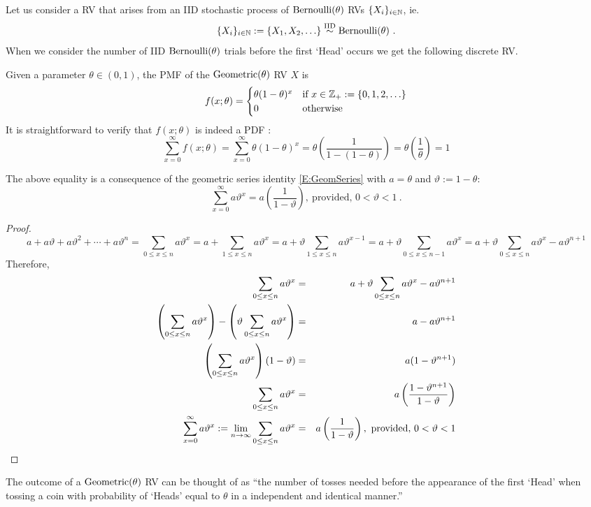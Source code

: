 Let us consider a RV that arises from an IID stochastic process of $\mbox{{\rm Bernoulli}}(\theta)$ RVs $\{X_i\}_{i \in \mathbb{N}}$, ie.~
\[
 \{X_i\}_{i \in \mathbb{N}} := \{X_1, X_2,\ldots\}  \overset{{\rm IID}}{\sim} \mbox{{\rm Bernoulli}}(\theta) \ .
\]
When we consider the number of IID $\mbox{{\rm Bernoulli}}(\theta)$ trials before the first `Head' occurs we get the following discrete RV.
\begin{model}
Given a parameter $\theta \in (0,1)$, the PMF of the $\mbox{{\rm Geometric}}(\theta)$ RV $X$ is
\begin{equation}\label{E:Geometricpdf}
f(x;\theta) =
\begin{cases}
\theta(1-\theta)^{x} & \text{if $x \in \mathbb{Z}_+ := \{0,1,2,\ldots \}$} \\
0 & \text{otherwise}
\end{cases}
\end{equation}
It is straightforward to verify that $f(x;\theta)$ is indeed a PDF :
\[
\sum_{x=0}^{\infty} f(x;\theta) = \sum_{x=0}^{\infty} \theta(1-\theta)^{x}
= \theta \left( \frac{1}{1-(1-\theta)} \right) =  \theta \left( \frac{1}{\theta} \right) = 1
\]

{\scriptsize
The above equality is a consequence of the geometric series identity \eqref{E:GeomSeries} with $a=\theta$ and $\vartheta:=1-\theta$:
\begin{equation}\label{E:GeomSeries}
 \sum_{ x =0}^{\infty} a \vartheta^x = a \left( \frac{1}{1-\vartheta} \right) , \ \text{provided, } 0 < \vartheta < 1 \ .
\end{equation}
\begin{proof}
\[
a+a\vartheta+a\vartheta^2+\cdots+a\vartheta^n
= \sum_{0 \leq x \leq n} a \vartheta^x
= a+ \sum_{1 \leq x \leq n} a \vartheta^x
= a +  \vartheta  \sum_{1 \leq x \leq n} a \vartheta^{x-1}
= a +  \vartheta  \sum_{0 \leq x \leq n-1} a \vartheta^{x}
= a +  \vartheta  \sum_{0 \leq x \leq n} a \vartheta^{x} - a \vartheta^{n+1}
\]
Therefore,
\begin{eqnarray}
\sum_{0 \leq x \leq n} a \vartheta^x
&=&  a +  \vartheta  \sum_{0 \leq x \leq n} a \vartheta^{x} - a \vartheta^{n+1} \notag \\
\left( \sum_{0 \leq x \leq n} a \vartheta^x \right) - \left( \vartheta  \sum_{0 \leq x \leq n} a \vartheta^{x} \right)
&=&  a  - a \vartheta^{n+1} \notag \\
\left( \sum_{0 \leq x \leq n} a \vartheta^x \right) (1-\vartheta)
&=&  a (1 -  \vartheta^{n+1}) \notag \\
\sum_{0 \leq x \leq n} a \vartheta^x
&=&  a \left( \frac{1 -  \vartheta^{n+1}}{1-\vartheta} \right) \notag\\
 \sum_{ x =0}^{\infty} a \vartheta^x  := \lim_{n \rightarrow \infty} \sum_{0 \leq x \leq n} a \vartheta^x
&=&  a \left( \frac{1}{1-\vartheta} \right) , \ \text{provided, } 0 < \vartheta < 1 \notag
\end{eqnarray}
\end{proof}
}
The outcome of a $\mbox{{\rm Geometric}}(\theta)$ RV can be thought of as ``the number of tosses needed before the appearance of the first `Head' when tossing a coin with probability of `Heads' equal to $\theta$ in a independent and identical manner.''
\end{model}

